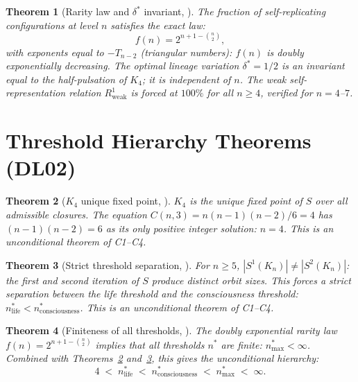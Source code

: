 \documentclass[11pt,a4paper]{article}
\theoremstyle{plain}
\newtheorem{theorem}{Theorem}[section]
\theoremstyle{definition}
\theoremstyle{remark}
\begin{document}
\begin{theorem}[Rarity law and $\delta^*$ invariant, \cite{DL01}]
\label{thm:DL01_rarity}
The fraction of self-replicating configurations at level $n$ satisfies the exact law:
\begin{equation}
f(n) = 2^{n+1-\binom{n}{2}},
\end{equation}
with exponents equal to $-T_{n-2}$ (triangular numbers): $f(n)$ is doubly exponentially decreasing. The optimal lineage variation $\delta^* = 1/2$ is an invariant equal to the half-pulsation of $K_4$; it is independent of $n$. The weak self-representation relation $R^1_{\mathrm{weak}}$ is forced at $100\%$ for all $n \geq 4$, verified for $n = 4$--$7$.
\end{theorem}

\section{Threshold Hierarchy Theorems (DL02)}
\label{sec:DL02}

\begin{theorem}[$K_4$ unique fixed point, \cite{DL02}]
\label{thm:DL02_unique}
$K_4$ is the unique fixed point of $S$ over all admissible closures. The equation $C(n,3) = n(n-1)(n-2)/6 = 4$ has $(n-1)(n-2) = 6$ as its only positive integer solution: $n = 4$. This is an unconditional theorem of C1--C4.
\end{theorem}

\begin{theorem}[Strict threshold separation, \cite{DL02}]
\label{thm:DL02_separation}
For $n \geq 5$, $|S^1(K_n)| \neq |S^2(K_n)|$: the first and second iteration of $S$ produce distinct orbit sizes. This forces a strict separation between the life threshold and the consciousness threshold: $n^*_{\mathrm{life}} < n^*_{\mathrm{consciousness}}$. This is an unconditional theorem of C1--C4.
\end{theorem}

\begin{theorem}[Finiteness of all thresholds, \cite{DL02}]
\label{thm:DL02_finiteness}
The doubly exponential rarity law $f(n) = 2^{n+1-\binom{n}{2}}$ implies that all thresholds $n^*$ are finite: $n^*_{\mathrm{max}} < \infty$. Combined with Theorems~\ref{thm:DL02_unique} and~\ref{thm:DL02_separation}, this gives the unconditional hierarchy:
\begin{equation}
4 \;<\; n^*_{\mathrm{life}} \;<\; n^*_{\mathrm{consciousness}} \;<\; n^*_{\mathrm{max}} \;<\; \infty.
\end{equation}
\end{theorem}
\end{document}
